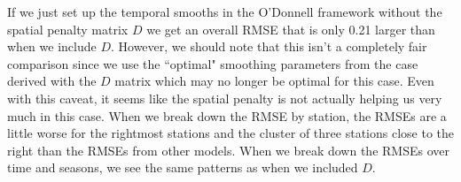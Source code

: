 \documentclass[12pt]{amsart}
\begin{document}
If we just set up the temporal smooths in the O'Donnell framework without the spatial penalty matrix $D$ we get an overall RMSE that is only 0.21 larger than when we include $D$. However, we should note that this isn't a completely fair comparison since we use the ``optimal" smoothing parameters from the case derived with the $D$ matrix which may no longer be optimal for this case. Even with this caveat, it seems like the spatial penalty is not actually helping us very much in this case. When we break down the RMSE by station, the RMSEs are a little worse for the rightmost stations and the cluster of three stations close to the right than the RMSEs from other models. When we break down the RMSEs over time and seasons, we see the same patterns as when we included $D$.





\textbf{}
\end{document}
